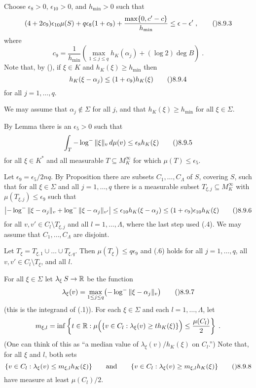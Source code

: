   Choose $\epsilon_8>0$, $\epsilon_{10}>0$, and $h_{\min}>0$
such that
$$(4+2c_9)\epsilon_{10}\mu(S) + q\epsilon_8(1+c_9)
    + \frac{\max\{0,c'-c\}}{h_{\min}}
  \le \epsilon-\epsilon'\;,\tag\08.9.3$$
where
$$c_9
  = \frac1{h_{\min}}\left(\max_{1\le j\le q} h_K(\alpha_j)
    + (\log 2)\deg B\right)\;.$$
Note that, by (), if $\xi\in K$ and $h_K(\xi)\ge h_{\min}$ then
$$h_K(\xi-\alpha_j) \le (1+c_9)h_K(\xi)\tag\08.9.4$$
for all $j=1,\dots,q$.

We may assume that $\alpha_j\notin\Sigma$ for all $j$,
and that $h_K(\xi)\ge h_{\min}$ for all $\xi\in\Sigma$.

By Lemma  there is an $\epsilon_5>0$ such that
$$\int_T {-\log^{-}\|\xi\|_v}\,d\mu(v) \le \epsilon_8 h_K(\xi)\tag\08.9.5$$
for all $\xi\in K^{*}$ and all measurable $T\subseteq M_K^\infty$
for which $\mu(T)\le\epsilon_5$.

Let $\epsilon_9=\epsilon_5/2nq$.  By Proposition  there are subsets
$C_1,\dots,C_\Lambda$ of $S$, covering $S$, such that for all $\xi\in\Sigma$
and all $j=1,\dots,q$ there is a measurable subset
$T_{\xi,j}\subseteq M_K^\infty$ with $\mu(T_{\xi,j})\le\epsilon_9$ such that
$$\bigl|-\log^{-}\|\xi-\alpha_j\|_v+\log^{-}\|\xi-\alpha_j\|_{v'}\bigr|
  \le \epsilon_{10} h_K(\xi-\alpha_j)
  \le (1+c_9)\epsilon_{10}h_K(\xi)\tag\08.9.6$$
for all $v,v'\in C_l\setminus T_{\xi,j}$ and all $l=1,\dots,\Lambda$,
where the last step used (.4).
We may assume that $C_1,\dots,C_\Lambda$ are disjoint.

Let $T_\xi=T_{\xi,1}\cup\dots\cup T_{\xi,q}$.  Then $\mu(T_\xi)\le q\epsilon_9$
and (.6) holds for all $j=1,\dots,q$, all $v,v'\in C_l\setminus T_\xi$,
and all $l$.

For all $\xi\in\Sigma$ let $\lambda_\xi\:S\to\Bbb R$ be the function
$$\lambda_\xi(v)
  = \max_{1\le j\le q}\bigl(-\log^{-}\|\xi-\alpha_j\|_v\bigr)\tag\08.9.7$$
(this is the integrand of (.1)).
For each $\xi\in\Sigma$ and each $l=1,\dots,\Lambda$, let
$$m_{\xi,l}
  = \inf\left\{t\in\Bbb R
    : \mu\Bigl(\{v\in C_l : \lambda_\xi(v) \ge th_K(\xi)\}\Bigr)
      \le\frac{\mu(C_l)}{2}\right\}\;.$$
(One can think of this as ``a median value of $\lambda_\xi(v)/h_K(\xi)$
on $C_l$.'')  Note that, for all $\xi$ and $l$,  both sets
$$\{v\in C_l : \lambda_\xi(v) \le m_{\xi,l}h_K(\xi)\} \qquad\text{and}\qquad
  \{v\in C_l : \lambda_\xi(v) \ge m_{\xi,l}h_K(\xi)\}\tag\08.9.8$$
have measure at least $\mu(C_l)/2$.

